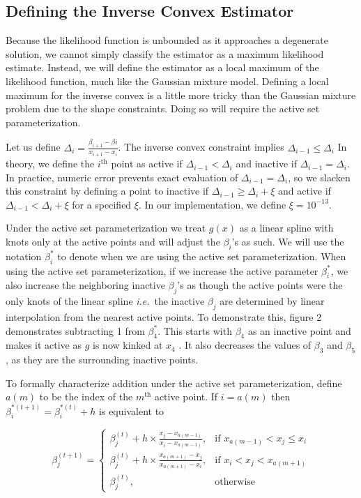 \documentclass[11pt]{article}
\numberwithin{equation}{section}
\begin{document}
	{\subsection{Defining the Inverse Convex Estimator} } 
	
	Because the likelihood function is unbounded as it approaches a degenerate solution, we cannot simply classify the estimator as a maximum likelihood estimate. Instead, we will define the estimator as a local maximum of the likelihood function, much like the Gaussian mixture model. Defining a local maximum for the inverse convex is a little more tricky than the Gaussian mixture problem due to the shape constraints. Doing so will require the active set parameterization. 
	
	Let us define $\Delta_i = \frac{\beta_{i+1} - \beta{i} } { x_{i+1} - x_{i} }$. The inverse convex constraint implies $\Delta_{i-1} \leq \Delta_{i}$ In theory, we define the $i^{\mathrm{th} }$ point as active if $\Delta_{i-1} < \Delta_{i}$ and inactive if $\Delta_{i-1} = \Delta_{i}$. In practice, numeric error prevents exact evaluation of $\Delta_{i-1} = \Delta_{i}$, so we slacken this constraint by defining a point to inactive if $\Delta_{i-1} \geq \Delta_{i} + \xi$ and active if $\Delta_{i-1} < \Delta_{i} + \xi$ for a specified $\xi$. In our implementation, we define $\xi = 10^{-13}$. 
	
	Under the active set parameterization  we treat $g(x)$ as a linear spline with knots only at the active points and will adjust the $\beta_i$'s as such. We will use the notation $\beta_i^*$ to denote when we are using the active set parameterization. When using the active set parameterization, if we increase the active parameter $ \beta_i^*$, we also increase the neighboring inactive $\beta_j$'s as though the active points were the only knots of the linear spline  \emph{i.e.}\ the inactive $\beta_j$ are determined by linear interpolation from the nearest active points. To demonstrate this, figure 2 demonstrates subtracting 1 from $\beta_4^*$. This starts with $\beta_4$ as an inactive point and makes it active as $g$ is now kinked at $x_4$ . It also decreases the values of $\beta_3$ and $\beta_5$, as they are the surrounding inactive points.  
	
	To formally characterize addition under the active set parameterization, define $a(m)$ to be the index of the $m^{\mathrm{th} } $ active point. If $i = a(m)$ then $\beta_i^{*(t+1)} = \beta_i^{*(t)} + h$ is equivalent to 
		
	\[
	\beta^{(t+1)}_j = 
	\begin{cases}
		\beta^{(t)}_j + h \times \frac{x_j - x_{a(m-1)} } {x_{i} - x_{a(m-1)} } , & \text{if } x_{a(m-1)} < x_j  \leq x_{i} \\ 
		\beta^{(t)}_j + h \times \frac{x_{a(m+1)} - x_j} {x_{a(m+1)} - x_{i} }, & \text{if } x_{ i} < x_j < x_{a(m+1)} \\ 
		\beta^{(t)}_j, & \text{otherwise}
	\end{cases}
	\]
\end{document}

